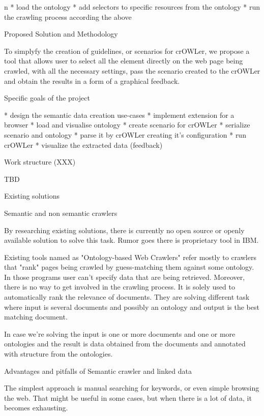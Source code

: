 \begitems \style n
  * load the ontology
  * add selectors to specific resources from the ontology
  * run the crawling process according the above
\enditems


\sec Proposed Solution and Methodology

To simplyfy the creation of guidelines, or scenarios for crOWLer, we propose a
tool that allows user to select all the element directly on the web page being
crawled, with all the necessary settings, pass the scenario created to the
crOWLer and obtain the results in a form of a graphical feedback. 

\sec Specific goals of the project

\begitems
  * design the semantic data creation use-cases
  * implement extension for a browser
  * load and visualise ontology
  * create scenario for crOWLer 
  * serialize scenario and ontology
  * parse it by crOWLer creating it's configuration
  * run crOWLer
  * visualize the extracted data (feedback)
\enditems


\sec Work structure (XXX)

TBD

\chap Existing solutions


\sec Semantic and non semantic crawlers

By researching existing solutions, there is currently no open source or openly
available solution to solve this task. Rumor goes there is proprietary tool in IBM.

Existing tools named as "Ontology-based Web Crawlers" refer mostly to crawlers
that "rank" pages being crawled by guess-matching them against some ontology.
In those programs user can't specify data that are being retrieved. Moreover,
there is no way to get involved in the crawling process. It is solely used to
automatically rank the relevance of documents. They are solving different task
where input is several documents and possibly an ontology and output is the
best matching document. 

In case we're solving  the input is one or more documents and one or more
ontologies and the result is data obtained from the documents and annotated
with structure from the ontologies. 

\sec Advantages and pitfalls of Semantic crawler and linked data

The simplest approach is manual searching for keywords, or even simple browsing
the web. That might be useful in some cases, but when there is a lot of data,
it becomes exhausting. 

